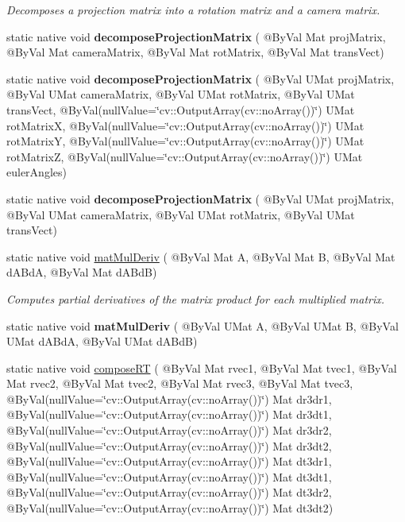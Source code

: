 \begin{DoxyCompactItemize}
\begin{DoxyCompactList}\small\item\em Decomposes a projection matrix into a rotation matrix and a camera matrix. \end{DoxyCompactList}\item 
static native void {\bfseries decompose\+Projection\+Matrix} ( @By\+Val Mat proj\+Matrix, @By\+Val Mat camera\+Matrix, @By\+Val Mat rot\+Matrix, @By\+Val Mat trans\+Vect)
\item 
static native void {\bfseries decompose\+Projection\+Matrix} ( @By\+Val U\+Mat proj\+Matrix, @By\+Val U\+Mat camera\+Matrix, @By\+Val U\+Mat rot\+Matrix, @By\+Val U\+Mat trans\+Vect, @By\+Val(null\+Value=\char`\"{}cv\+::\+Output\+Array(cv\+::no\+Array())\char`\"{}) U\+Mat rot\+MatrixX, @By\+Val(null\+Value=\char`\"{}cv\+::\+Output\+Array(cv\+::no\+Array())\char`\"{}) U\+Mat rot\+MatrixY, @By\+Val(null\+Value=\char`\"{}cv\+::\+Output\+Array(cv\+::no\+Array())\char`\"{}) U\+Mat rot\+MatrixZ, @By\+Val(null\+Value=\char`\"{}cv\+::\+Output\+Array(cv\+::no\+Array())\char`\"{}) U\+Mat euler\+Angles)
\item 
static native void {\bfseries decompose\+Projection\+Matrix} ( @By\+Val U\+Mat proj\+Matrix, @By\+Val U\+Mat camera\+Matrix, @By\+Val U\+Mat rot\+Matrix, @By\+Val U\+Mat trans\+Vect)
\item 
static native void \hyperlink{group__calib3d_ga54d99b18b60bd50e50e0de105d68003b}{mat\+Mul\+Deriv} ( @By\+Val Mat A, @By\+Val Mat B, @By\+Val Mat d\+A\+BdA, @By\+Val Mat d\+A\+BdB)
\begin{DoxyCompactList}\small\item\em Computes partial derivatives of the matrix product for each multiplied matrix. \end{DoxyCompactList}\item 
static native void {\bfseries mat\+Mul\+Deriv} ( @By\+Val U\+Mat A, @By\+Val U\+Mat B, @By\+Val U\+Mat d\+A\+BdA, @By\+Val U\+Mat d\+A\+BdB)
\item 
static native void \hyperlink{group__calib3d_ga04fb0a4a5daa37377b0aa4b4ed2d6774}{compose\+RT} ( @By\+Val Mat rvec1, @By\+Val Mat tvec1, @By\+Val Mat rvec2, @By\+Val Mat tvec2, @By\+Val Mat rvec3, @By\+Val Mat tvec3, @By\+Val(null\+Value=\char`\"{}cv\+::\+Output\+Array(cv\+::no\+Array())\char`\"{}) Mat dr3dr1, @By\+Val(null\+Value=\char`\"{}cv\+::\+Output\+Array(cv\+::no\+Array())\char`\"{}) Mat dr3dt1, @By\+Val(null\+Value=\char`\"{}cv\+::\+Output\+Array(cv\+::no\+Array())\char`\"{}) Mat dr3dr2, @By\+Val(null\+Value=\char`\"{}cv\+::\+Output\+Array(cv\+::no\+Array())\char`\"{}) Mat dr3dt2, @By\+Val(null\+Value=\char`\"{}cv\+::\+Output\+Array(cv\+::no\+Array())\char`\"{}) Mat dt3dr1, @By\+Val(null\+Value=\char`\"{}cv\+::\+Output\+Array(cv\+::no\+Array())\char`\"{}) Mat dt3dt1, @By\+Val(null\+Value=\char`\"{}cv\+::\+Output\+Array(cv\+::no\+Array())\char`\"{}) Mat dt3dr2, @By\+Val(null\+Value=\char`\"{}cv\+::\+Output\+Array(cv\+::no\+Array())\char`\"{}) Mat dt3dt2)

\end{DoxyCompactItemize}
